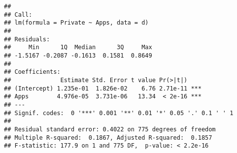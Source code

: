 \documentclass[]{article}
\begin{document}
\begin{verbatim}
## 
## Call:
## lm(formula = Private ~ Apps, data = d)
## 
## Residuals:
##     Min      1Q  Median      3Q     Max 
## -1.5167 -0.2087 -0.1613  0.1581  0.8649 
## 
## Coefficients:
##              Estimate Std. Error t value Pr(>|t|)    
## (Intercept) 1.235e-01  1.826e-02    6.76 2.71e-11 ***
## Apps        4.976e-05  3.731e-06   13.34  < 2e-16 ***
## ---
## Signif. codes:  0 '***' 0.001 '**' 0.01 '*' 0.05 '.' 0.1 ' ' 1
## 
## Residual standard error: 0.4022 on 775 degrees of freedom
## Multiple R-squared:  0.1867, Adjusted R-squared:  0.1857 
## F-statistic: 177.9 on 1 and 775 DF,  p-value: < 2.2e-16
\end{verbatim}
\end{document}
